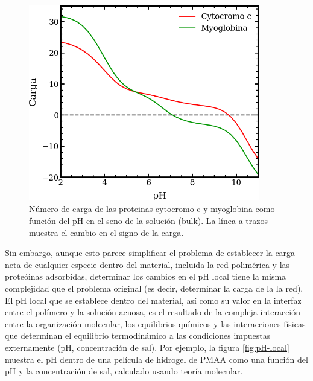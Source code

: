\begin{figure}
    \centering
    \includegraphics[width=0.9\textwidth]{Figures/graph-film/carga-proteinas.png}
    \caption{N\'umero de carga de las proteinas cytocromo c y myoglobina como  funci\'on del pH en el seno de la soluci\'on (bulk). La l\'inea a trazos muestra el cambio en el signo de la carga.}
    \label{fig:protein-charge}
\end{figure}



Sin embargo, aunque esto parece simplificar el problema de establecer la carga neta de cualquier especie dentro del material, incluida la red polim\'erica y las prote\'oinas adsorbidas, determinar los cambios en el pH local tiene la misma complejidad que el problema original (es decir, determinar la carga de la la red). El pH local que se establece dentro del material, as\'i como su valor en la interfaz entre el pol\'imero y la soluci\'on acuosa, es el resultado de la compleja interacci\'on entre la organizaci\'on molecular, los equilibrios qu\'imicos y las interacciones f\'isicas que determinan el equilibrio termodin\'amico a las condiciones impuestas externamente (pH, concentraci\'on de sal). Por ejemplo, la figura \ref{fig:pH-local} muestra el pH dentro de una pel\'icula de hidrogel de PMAA como una funci\'on del pH  y la concentraci\'on de sal, calculado usando teor\'ia molecular.

